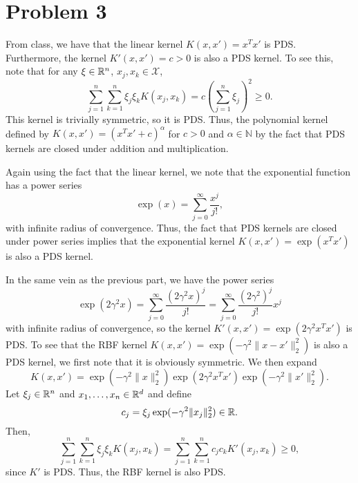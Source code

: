 \documentclass{article}
\begin{document}
\section{Problem 3}
From class, we have that the linear kernel $K(x,x')=x^Tx'$ is PDS. Furthermore, the kernel $K'(x,x')=c>0$ is also a PDS kernel. To see this, note that for any $\xi\in\mathbb{R}^n$, $x_j,x_k\in\mathcal{X}$,
\[
\sum_{j=1}^{n}\sum_{k=1}^{n}\xi_j\xi_k K(x_j,x_k)=c\left(\sum_{j=1}^{n}\xi_j\right)^2\geq0.
\]
This kernel is trivially symmetric, so it is PDS. Thus, the polynomial kernel defined by $K(x,x')=(x^Tx'+c)^\alpha$ for $c>0$ and $\alpha\in\mathbb{N}$ by the fact that PDS kernels are closed under addition and multiplication.

Again using the fact that the linear kernel, we note that the exponential function has a power series
\[
\exp(x)=\sum_{j=0}^\infty\frac{x^j}{j!},
\]
with infinite radius of convergence. Thus, the fact that PDS kernels are closed under power series implies that the exponential kernel $K(x,x')=\exp(x^Tx')$ is also a PDS kernel.

In the same vein as the previous part, we have the power series
\[
\exp(2\gamma^2x)=\sum_{j=0}^\infty\frac{(2\gamma^2x)^j}{j!}=\sum_{j=0}^\infty\frac{(2\gamma^2)^j}{j!}x^j
\]
with infinite radius of convergence, so the kernel $K'(x,x')=\exp(2\gamma^2x^Tx')$ is PDS. To see that the RBF kernel $K(x,x')=\exp(-\gamma^2\|x-x'\|_2^2)$ is also a PDS kernel, we first note that it is obviously symmetric. We then expand
\[
K(x,x')=\exp(-\gamma^2\|x\|_2^2)\exp(2\gamma^2x^Tx')\exp(-\gamma^2\|x'\|_2^2).
\]
Let $\xi_j\in\mathbb{R}^n$ and $x_1,\ldots,x_n\in\mathbb{R}^d$ and define 
\[
c_j=\xi_j\exp(-\gamma^2\|x_j\|_2^2)\in\mathbb{R}.
\]
Then,
\[
\sum_{j=1}^{n}\sum_{k=1}^{n}\xi_j\xi_k K(x_j,x_k)=\sum_{j=1}^{n}\sum_{k=1}^{n}c_jc_kK'(x_j,x_k)\geq0,
\]
since $K'$ is PDS. Thus, the RBF kernel is also PDS.
\end{document}
